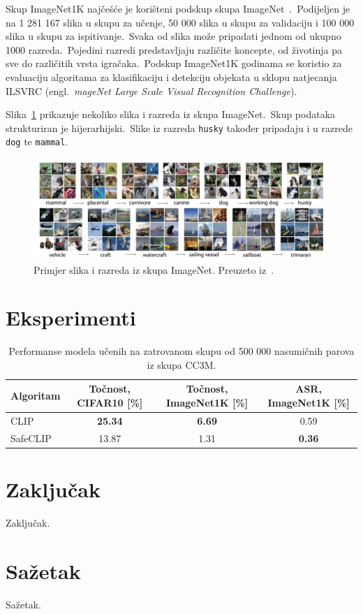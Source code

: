 \documentclass[times, utf8, seminar, numeric]{fer}
\begin{document}
Skup ImageNet1K najčešće je korišteni podskup skupa ImageNet~\cite{deng2009imagenet}.\ 
Podijeljen je na 1 281 167 slika u skupu za učenje, 50 000 slika u skupu za validaciju i 100 000 slika u skupu za ispitivanje.\ 
Svaka od slika može pripadati jednom od ukupno 1000 razreda.\ Pojedini razredi predstavljaju različite koncepte, od životinja pa sve do različitih vrsta igračaka.\ 
Podskup ImageNet1K godinama se koristio za evaluaciju algoritama za klasifikaciju i detekciju objekata u sklopu natjecanja ILSVRC (engl.\ \textit{mageNet Large Scale Visual Recognition Challenge}).\
  
Slika~\ref{fig:imagenet} prikazuje nekoliko slika i razreda iz skupa ImageNet.\ Skup podataka strukturiran je hijerarhijski.\ Slike iz razreda \texttt{husky} također pripadaju i u razrede \texttt{dog} te \texttt{mammal}.\

\begin{figure}[h]
    \centering
    \includegraphics[scale=0.33]{./Slike/imagenet.png}
    \caption{Primjer slika i razreda iz skupa ImageNet. Preuzeto iz~\cite{deng2009imagenet}.}
    \label{fig:imagenet}
\end{figure}

\chapter{Eksperimenti}

\begin{table}[htb]
    \caption{Performanse modela učenih na zatrovanom skupu od 500 000 nasumičnih parova iz skupa CC3M.}
    \label{tbl:performanse_zatrovano}
    \centering
    \begin{tabular}{lccc} \hline
    Algoritam & Točnost, CIFAR10 [\%] & Točnost, ImageNet1K [\%] & ASR, ImageNet1K [\%] \\ \hline
    CLIP & \textbf{25.34} & \textbf{6.69} & 0.59 \\
    SafeCLIP & 13.87 & 1.31 & \textbf{0.36} \\
    \end{tabular}
\end{table}

\chapter{Zaključak}

Zaključak.




\chapter{Sažetak}
Sažetak.
\end{document}
